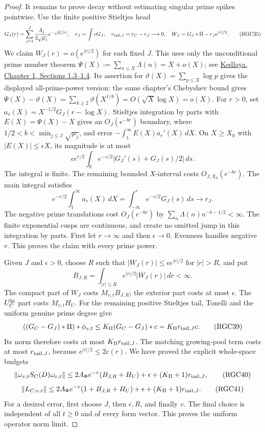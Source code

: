 \documentclass[11pt]{article}
\theoremstyle{remark}\newtheorem{remark}[theorem]{Remark}
\begin{document}
\begin{proof}
It remains to prove decay without estimating singular prime
spikes pointwise. Use the finite positive Stieltjes head
\[
 G_J(r)=\sum_{j=1}^J
        \frac{A_j}{2\sqrt{\mu_j}}e^{-\sqrt{\mu_j}|r|},
 \quad r_J=\int cG_J,\quad
 r_{{\rm tail},J}=r_C-r_J\longrightarrow0,
 \quad W_J=G_J*\Pi-r_Je^{|r|/2}.
 \tag{RGC35}
\]
We claim \(W_J(r)=o(e^{|r|/2})\) for each fixed \(J\).
This uses only the unconditional prime number theorem
\(\Psi(X):=\sum_{n\le X}\Lambda(n)=X+o(X)\);
see \href{https://kskedlaya.org/ant/chap-pnt.html}
{Kedlaya, Chapter 1, Sections 1.3--1.4}.
Its assertion for \(\vartheta(X)=\sum_{p\le X}\log p\) gives
the displayed all-prime-power version: the same chapter's
Chebyshev bound gives
\(\Psi(X)-\vartheta(X)=\sum_{k\ge2}\vartheta(X^{1/k})
=O(\sqrt X\log X)=o(X)\).
For \(r>0\), set
\(a_r(X)=X^{-1/2}G_J(r-\log X)\).
Stieltjes integration by parts with \(E(X)=\Psi(X)-X\)
gives an \(O_J(e^{-b r})\) boundary, where
\(1/2<b<\min_{j\le J}\sqrt{\mu_j}\), and error
\(-\int_1^\infty E(X)a_r'(X)\,dX\).
On \(X\ge X_0\) with \(|E(X)|\le\epsilon X\), its magnitude is
at most
\[
 \epsilon e^{r/2}
 \int_{\mathbb R}e^{-s/2}
             |G_J'(s)+G_J(s)/2|\,ds .
 \tag{RGC36}
\]
The integral is finite. The remaining bounded \(X\)-interval
costs \(O_{J,X_0}(e^{-b r})\). The main integral satisfies
\[
 e^{-r/2}\int_1^\infty a_r(X)\,dX
   =\int_{-\infty}^r e^{-s/2}G_J(s)\,ds\longrightarrow r_J .
 \tag{RGC37}
\]
The negative prime translations cost \(O_J(e^{-b r})\)
by \(\sum_n\Lambda(n)n^{-b-1/2}<\infty\).
The finite exponential cusps are continuous, and create no
omitted jump in this integration by parts. First let \(r\to\infty\)
and then \(\epsilon\to0\). Evenness handles negative \(r\).
This proves the claim with every prime power.

Given \(J\) and \(\epsilon>0\), choose \(R\) such that
\(|W_J(r)|\le\epsilon e^{|r|/2}\) for \(|r|>R\), and put
\[
 B_{J,R}=\int_{|r|\le R}e^{|r|/2}|W_J(r)|\,dr<\infty .
 \tag{RGC38}
\]
The compact part of \(W_J\) costs \(M_{v,t}B_{J,R}\);
the exterior part costs at most \(\epsilon\).
The \(U_C^{\rm hi}\) part costs \(M_{v,t}H_U\).
For the remaining positive Stieltjes tail, Tonelli and the
uniform genuine prime degree give
\[
 ((G_C-G_J)*\Pi)*\phi_{v,t}
      \le K_\Pi (G_C-G_J)*c
      =K_\Pi r_{{\rm tail},J}c .
 \tag{RGC39}
\]
Its norm therefore costs at most \(K_\Pi r_{{\rm tail},J}\).
The matching growing-pool term costs at most
\(r_{{\rm tail},J}\), because \(e^{|r|/2}\le2c(r)\).
We have proved the explicit whole-space budgets
\[
 \|\omega_{v,t}S_C(D)\omega_{v,t}\|
 \le 2A_\Phi e^{-v}(B_{J,R}+H_U)
       +\epsilon+(K_\Pi+1)r_{{\rm tail},J},
 \tag{RGC40}
\]
\[
 \|L_{C;v,t}\|
 \le 2A_\Phi e^{-v}(1+B_{J,R}+H_U)
       +\epsilon+(K_\Pi+1)r_{{\rm tail},J}.
 \tag{RGC41}
\]
For a desired error, first choose \(J\), then \(\epsilon,R\),
and finally \(v\). The final choice is independent of all
\(t\ge0\) and of every form vector. This proves the uniform
operator norm limit.


\end{proof}
\end{document}
